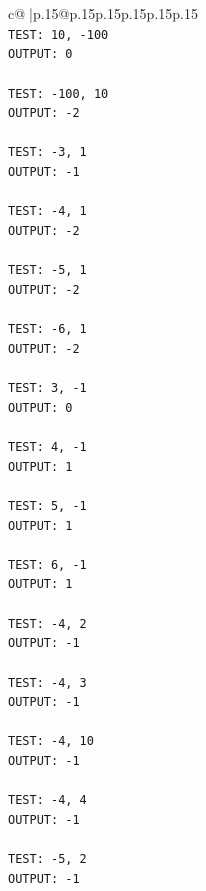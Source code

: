 \documentclass{article}
\begin{document}
{\begin{supertabular}{c@{$\;$}|p{.15\linewidth}@{}p{.15\linewidth}p{.15\linewidth}p{.15\linewidth}p{.15\linewidth}p{.15\linewidth}}
{{{\\ 
\texttt{TEST: 10, {-}100} \\
\texttt{OUTPUT: 0} \\
\\ 
\texttt{TEST: {-}100, 10} \\
\texttt{OUTPUT: {-}2} \\
\\ 
\texttt{TEST: {-}3, 1} \\
\texttt{OUTPUT: {-}1} \\
\\ 
\texttt{TEST: {-}4, 1} \\
\texttt{OUTPUT: {-}2} \\
\\ 
\texttt{TEST: {-}5, 1} \\
\texttt{OUTPUT: {-}2} \\
\\ 
\texttt{TEST: {-}6, 1} \\
\texttt{OUTPUT: {-}2} \\
\\ 
\texttt{TEST: 3, {-}1} \\
\texttt{OUTPUT: 0} \\
\\ 
\texttt{TEST: 4, {-}1} \\
\texttt{OUTPUT: 1} \\
\\ 
\texttt{TEST: 5, {-}1} \\
\texttt{OUTPUT: 1} \\
\\ 
\texttt{TEST: 6, {-}1} \\
\texttt{OUTPUT: 1} \\
\\ 
\texttt{TEST: {-}4, 2} \\
\texttt{OUTPUT: {-}1} \\
\\ 
\texttt{TEST: {-}4, 3} \\
\texttt{OUTPUT: {-}1} \\
\\ 
\texttt{TEST: {-}4, 10} \\
\texttt{OUTPUT: {-}1} \\
\\ 
\texttt{TEST: {-}4, 4} \\
\texttt{OUTPUT: {-}1} \\
\\ 
\texttt{TEST: {-}5, 2} \\
\texttt{OUTPUT: {-}1} \\
}}}
\end{supertabular}}
\end{document}
